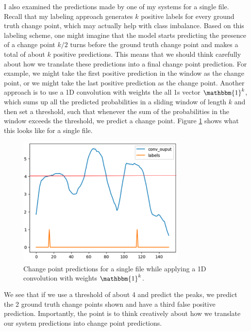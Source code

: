 \documentclass[12pt]{article}
\begin{document}
I also examined the predictions made by one of my systems for a single file. Recall that my labeling approach generates $k$ positive labels for every ground truth change point, which may actually help with class imbalance. Based on this labeling scheme, one might imagine that the model starts predicting the presence of a change point $k/2$ turns before the ground truth change point and makes a total of about $k$ positive predictions. This means that we should think carefully about how we translate these predictions into a final change point prediction. For example, we might take the first positive prediction in the window as the change point, or we might take the last positive prediction as the change point. Another approach is to use a 1D convolution with weights the all 1s vector $\mathbbm{1}^k$, which sums up all the predicted probabilities in a sliding window of length $k$ and then set a threshold, such that whenever the sum of the probabilities in the window exceeds the threshold, we predict a change point. Figure \ref{fig:change_point_predictions} shows what this looks like for a single file.

\begin{figure}[H]
    \centering
    \includegraphics[width=0.75\textwidth]{./analysis/change_point_predictions.png}
    \caption{Change point predictions for a single file while applying a 1D convolution with weights $\mathbbm{1}^k$.}
    \label{fig:change_point_predictions}
\end{figure}

We see that if we use a threshold of about 4 and predict the peaks, we predict the 2 ground truth change points shown and have a third false positive prediction. Importantly, the point is to think creatively about how we translate our system predictions into change point predictions.
\end{document}
